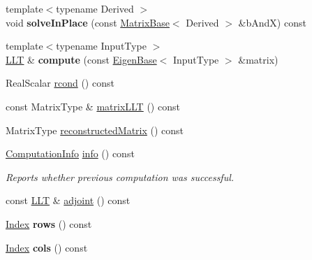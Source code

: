 \begin{DoxyCompactItemize}
\item 
\mbox{\label{class_eigen_1_1_l_l_t_a57636109ebeebe027e3697e486e65f47}} 
{\footnotesize template$<$typename Derived $>$ }\\void {\bfseries solve\+In\+Place} (const \mbox{\hyperlink{class_eigen_1_1_matrix_base}{Matrix\+Base}}$<$ Derived $>$ \&b\+AndX) const
\item 
\mbox{\label{class_eigen_1_1_l_l_t_a047903df237859a988d8935ad3a02d0f}} 
{\footnotesize template$<$typename Input\+Type $>$ }\\\mbox{\hyperlink{class_eigen_1_1_l_l_t}{L\+LT}} \& {\bfseries compute} (const \mbox{\hyperlink{struct_eigen_1_1_eigen_base}{Eigen\+Base}}$<$ Input\+Type $>$ \&matrix)
\item 
Real\+Scalar \mbox{\hyperlink{class_eigen_1_1_l_l_t_a59338fa78db171d02fd5a2c9e4f3a30c}{rcond}} () const
\item 
const Matrix\+Type \& \mbox{\hyperlink{class_eigen_1_1_l_l_t_af62881fc95c7e54a93b63c20f2c62b46}{matrix\+L\+LT}} () const
\item 
Matrix\+Type \mbox{\hyperlink{class_eigen_1_1_l_l_t_a8b6ba1bc41811c50e65cac8db597d802}{reconstructed\+Matrix}} () const
\item 
\mbox{\hyperlink{group__enums_ga85fad7b87587764e5cf6b513a9e0ee5e}{Computation\+Info}} \mbox{\hyperlink{class_eigen_1_1_l_l_t_adb1295e7d2b1fd825a041345ae08be54}{info}} () const
\begin{DoxyCompactList}\small\item\em Reports whether previous computation was successful. \end{DoxyCompactList}\item 
const \mbox{\hyperlink{class_eigen_1_1_l_l_t}{L\+LT}} \& \mbox{\hyperlink{class_eigen_1_1_l_l_t_a559aba3a7c41f7fc87ec84327bb72ccd}{adjoint}} () const
\item 
\mbox{\label{class_eigen_1_1_l_l_t_a964802e4662be3d2982c7ac7e5cb1cc4}} 
\mbox{\hyperlink{class_eigen_1_1_l_l_t_ac7a64274814fa76e8b1e9e945546037f}{Index}} {\bfseries rows} () const
\item 
\mbox{\label{class_eigen_1_1_l_l_t_a5d42bfeb153842ea6d88e15683b9a41f}} 
\mbox{\hyperlink{class_eigen_1_1_l_l_t_ac7a64274814fa76e8b1e9e945546037f}{Index}} {\bfseries cols} () const
\item 

\end{DoxyCompactItemize}
